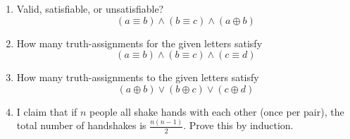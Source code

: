 \begin{mdframed}[linewidth=1]
\begin{enumerate}
    \item Valid, satisfiable, or unsatisfiable?
    \[
        (a \equiv b) \land (b \equiv c) \land (a \oplus b)
    \]

    \item How many truth-assignments for the given letters satisfy 
    \[
         (a \equiv b) \land (b \equiv c) \land (c \equiv d)
     \] 

     \item How many truth-assignments to the given letters satisfy
    \[
        (a \oplus b) \vee (b \oplus c) \vee (c \oplus d)
    \]

    \item I claim that if $n$ people all shake hands with each other (once per pair), the total number of handshakes is $\frac{n(n-1)}{2}$. Prove this by induction. 
\end{enumerate}
\end{mdframed}
\newpage
